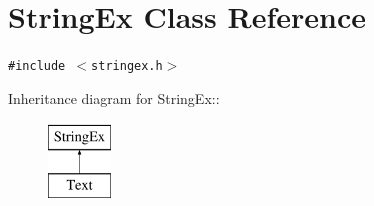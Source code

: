 \hypertarget{classStringEx}{
\section{StringEx Class Reference}
\label{classStringEx}
}
{\tt \#include $<$stringex.h$>$}

Inheritance diagram for StringEx::\begin{figure}[H]
\begin{center}
\leavevmode
\includegraphics[height=2cm]{classStringEx}
\end{center}
\end{figure}
